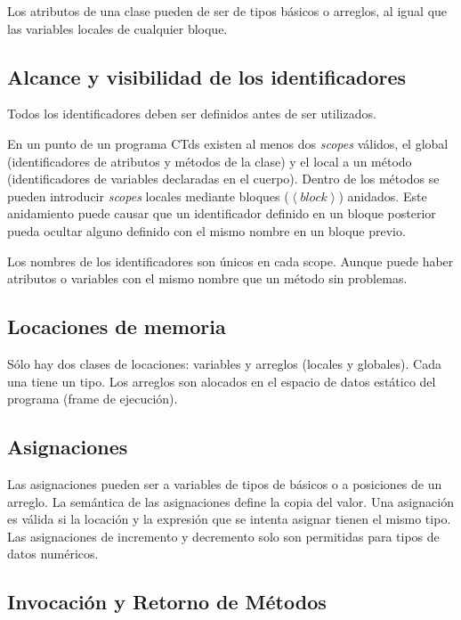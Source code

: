 \documentclass[11pt,a4paper]{article}
\begin{document}
Los atributos de una clase pueden de ser de tipos básicos o arreglos, al igual que las variables locales de cualquier bloque.

\subsection{Alcance y visibilidad de los identificadores}
\label{identificadores}

Todos los identificadores deben ser definidos antes de ser utilizados. 

En un punto de un programa CTds existen al menos dos \textit{scopes} válidos, el global (identificadores de atributos y métodos de la clase) y el local a un método (identificadores de variables declaradas en el cuerpo). Dentro de los métodos se pueden introducir \textit{scopes} locales mediante bloques ($\left\langle block \right\rangle$) anidados. Este anidamiento puede causar que un identificador definido en un bloque posterior pueda ocultar alguno definido con el mismo nombre en un bloque previo.

Los nombres de los identificadores son únicos en cada scope. Aunque puede haber atributos o variables con el mismo nombre que un método sin problemas.

\subsection{Locaciones de memoria}
\label{locaciones}

Sólo hay dos clases de locaciones: variables y arreglos (locales y globales). Cada una tiene un tipo. Los arreglos son alocados en el espacio de datos estático del programa (frame de ejecución). 

\subsection{Asignaciones}
\label{asignaciones}

Las asignaciones pueden ser a variables de tipos de básicos o a posiciones de un arreglo. La semántica de las asignaciones define la copia del valor. Una asignación es válida si la locación y la expresión que se intenta asignar tienen el mismo tipo. Las asignaciones de incremento y decremento solo son permitidas para tipos de datos numéricos.

\subsection{Invocación y Retorno de Métodos}
\label{metodos}
\end{document}
